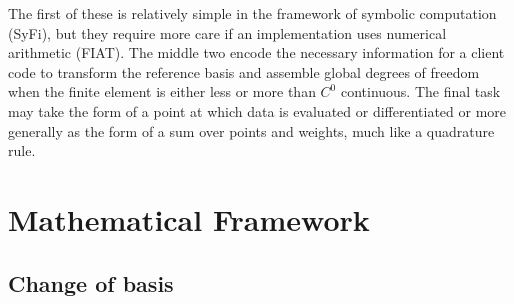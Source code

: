 The first of these is relatively simple in the framework
of symbolic computation (SyFi), but they require more care if an
implementation uses numerical arithmetic (FIAT).  The middle two
encode the necessary information for a client code to transform the
reference basis and assemble global degrees of freedom when the
finite element is either less or more than $C^0$ continuous. The final
task may take the form of a point at which data is evaluated or
differentiated or more generally as the form of a sum over points and
weights,  much like a quadrature rule.


\section{Mathematical Framework}
\subsection{Change of basis}


